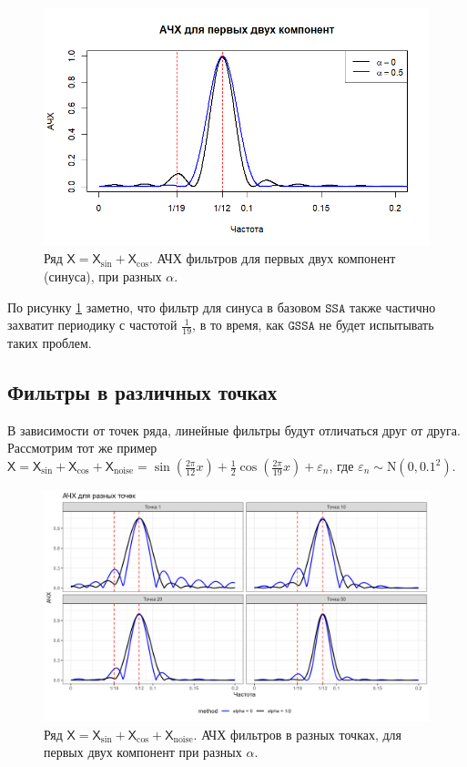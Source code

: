 \documentclass[12pt, specialist, subf
]{disser}
\theoremstyle{definition}
\newcommand{\SSA}{\texttt{SSA}}
\newcommand{\GSSA}{\texttt{GSSA}}
\newcommand{\TS}{\mathsf{X}}
\begin{document}
\begin{figure}[H]
	\centering
	\includegraphics[width=1\textwidth]{img/various_alphas_sin_cos.png}
	\caption{Ряд $\TS = \TS_{\sin} + \TS_{\cos}$. АЧХ фильтров для первых двух компонент (синуса), при разных $\alpha$.}
	\label{fig:various_alphas_sin_cos}
\end{figure}

По рисунку \ref{fig:various_alphas_sin_cos} заметно, что фильтр для синуса в базовом $\SSA$ также частично захватит периодику с частотой $\frac{1}{19}$, в то время, как $\GSSA$ не будет испытывать таких проблем.

\subsection{Фильтры в различных точках}
В зависимости от точек ряда, линейные фильтры будут отличаться друг от друга. Рассмотрим тот же пример $\TS = \TS_{\sin} + \TS_{\cos} + \TS_{\mathrm{noise}} =
	\sin\left(\frac{2\pi}{12}x\right) +
	\frac{1}{2}\cos\left(\frac{2\pi}{19}x\right)+
	\varepsilon_n$,
где $\varepsilon_n \sim \mathrm N(0, 0.1^2)$.
\begin{figure}[H]
	\centering
	\includegraphics[width=1\textwidth]{img/afc_4_points.png}
	\caption{Ряд $\TS = \TS_{\sin} + \TS_{\cos}+ \TS_{\mathrm{noise}}$. АЧХ фильтров в разных точках, для первых двух компонент при разных $\alpha$.}
	\label{fig:filter_point_depends}
\end{figure}
\end{document}
